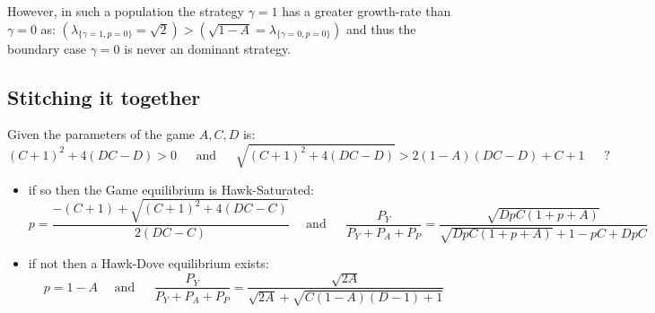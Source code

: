 However, in such a population the strategy $\gamma=1$ has a greater growth-rate than $\gamma=0$ as: $\left(\lambda_{\{\gamma=1,p=0\}} = \sqrt{2}\right) > \left(\sqrt{1-A} = \lambda_{\{\gamma=0,p=0\}}\right)$
and thus the boundary case $\gamma=0$ is never an dominant strategy.

\subsection{Stitching it together}

Given the parameters of the game $A,C,D$ is: $$(C+1)^2+4(DC-D)>0 ~~~~~~~\text{and}~~~~~~~ \sqrt{(C+1)^2+4(DC-D)} > 2(1-A)(DC-D)+C+1 ~~~~~~~\text{?} $$
\begin{itemize}[leftmargin=*,labelsep=3mm]
\item	if so then the Game equilibrium is Hawk-Saturated:$$p=\frac{-(C+1)+\sqrt{(C+1)^2+4(DC-C)}}{2(DC-C)}~~~~~~\text{and}~~~~~~~\frac{P_Y}{P_Y+P_A+P_P} = \frac{\sqrt{DpC(1+p+A)}}{\sqrt{DpC(1+p+A)}+1-pC+DpC}$$
\item	if not then a Hawk-Dove equilibrium exists:$$p=1-A~~~~~~\text{and}~~~~~~~\frac{P_Y}{P_Y+P_A+P_P} = \frac{\sqrt{2A}}{\sqrt{2A}+\sqrt{C(1-A)(D-1)+1}}$$
\end{itemize}

